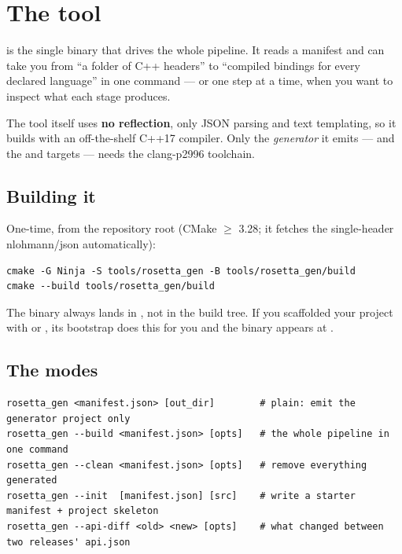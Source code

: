 \chapter{The  tool}
\label{ch:rosettagen}

 is the single binary that drives the whole pipeline. It
reads a manifest and can take you from ``a folder of C++ headers'' to ``compiled
bindings for every declared language'' in one command --- or one step at a time,
when you want to inspect what each stage produces.

The tool itself uses \textbf{no reflection}, only JSON parsing and text
templating, so it builds with an off-the-shelf C++17 compiler. Only the
\emph{generator} it emits --- and the  and  targets ---
needs the clang-p2996 toolchain.

\section{Building it}

One-time, from the repository root (CMake $\geq$ 3.28; it fetches the
single-header nlohmann/json automatically):

\begin{lstlisting}[style=sh]
cmake -G Ninja -S tools/rosetta_gen -B tools/rosetta_gen/build
cmake --build tools/rosetta_gen/build
\end{lstlisting}

The binary always lands in \textbf{}, not in the
build tree. If you scaffolded your project with  or
, its bootstrap  does this for you and the binary appears at
.

\section{The modes}

\begin{lstlisting}[style=plain]
rosetta_gen <manifest.json> [out_dir]        # plain: emit the generator project only
rosetta_gen --build <manifest.json> [opts]   # the whole pipeline in one command
rosetta_gen --clean <manifest.json> [opts]   # remove everything generated
rosetta_gen --init  [manifest.json] [src]    # write a starter manifest + project skeleton
rosetta_gen --api-diff <old> <new> [opts]    # what changed between two releases' api.json
\end{lstlisting}

